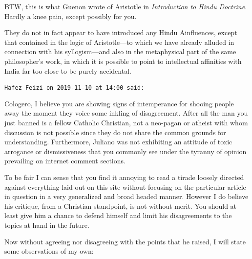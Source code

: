\begin{footnotesize}
\begin{sffamily}
BTW, this is what Guenon wrote of Aristotle in \emph{Introduction to Hindu Doctrine}. Hardly a knee pain, except possibly for you.

\begin{quotex}
They do not in fact appear to have introduced any Hindu Ainfluences, except that contained in the logic of Aristotle—to which we have already alluded in connection with his syllogism—and also in the metaphysical part of the same philosopher's work, in which it is possible to point to intellectual affinities with India far too close to be purely accidental. 

\end{quotex}

\hfill

\texttt{Hafez Feizi on 2019-11-10 at 14:00 said: }

Cologero, I believe you are showing signs of intemperance for shooing people away the moment they voice some inkling of disagreement. After all the man you just banned is a fellow Catholic Christian, not a neo-pagan or atheist with whom discussion is not possible since they do not share the common grounds for understanding. Furthermore, Juliano was not exhibiting an attitude of toxic arrogance or dismissiveness that you commonly see under the tyranny of opinion prevailing on internet comment sections. 

To be fair I can sense that you find it annoying to read a tirade loosely directed against everything laid out on this site without focusing on the particular article in question in a very generalized and broad headed manner. However I do believe his critique, from a Christian standpoint, is not without merit. You should at least give him a chance to defend himself and limit his disagreements to the topics at hand in the future.

Now without agreeing nor disagreeing with the points that he raised, I will state some observations of my own: 


\end{sffamily}
\end{footnotesize}
